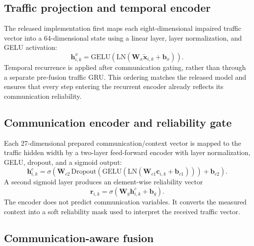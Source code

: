 \documentclass[pdflatex,sn-mathphys-num]{sn-jnl}%
\newenvironment{changed}{}{}
\theoremstyle{thmstyleone}%
\theoremstyle{thmstyletwo}%
\theoremstyle{thmstylethree}%
\begin{document}
\begin{changed}
\subsection{Traffic projection and temporal encoder}
\label{subsec:traffic_temporal_encoder}

The released implementation first maps each eight-dimensional impaired traffic vector into a 64-dimensional state using a linear layer, layer normalization, and GELU activation:
\begin{equation}
\mathbf{h}^{x}_{i,k}=\mathrm{GELU}\!\left(\mathrm{LN}\!\left(\mathbf{W}_{x}\widetilde{\mathbf{x}}_{i,k}+\mathbf{b}_{x}\right)\right).
\end{equation}
Temporal recurrence is applied after communication gating, rather than through a separate pre-fusion traffic GRU. This ordering matches the released model and ensures that every step entering the recurrent encoder already reflects its communication reliability.

\subsection{Communication encoder and reliability gate}
\label{subsec:communication_encoder}

Each 27-dimensional prepared communication/context vector is mapped to the traffic hidden width by a two-layer feed-forward encoder with layer normalization, GELU, dropout, and a sigmoid output:
\begin{equation}
\mathbf{h}^{c}_{i,k}=\sigma\!\left(\mathbf{W}_{c2}\,\mathrm{Dropout}\!\left(\mathrm{GELU}\!\left(\mathrm{LN}\!\left(\mathbf{W}_{c1}\mathbf{c}_{i,k}+\mathbf{b}_{c1}\right)\right)\right)+\mathbf{b}_{c2}\right).
\end{equation}
A second sigmoid layer produces an element-wise reliability vector
\begin{equation}
\mathbf{r}_{i,k}=\sigma\!\left(\mathbf{W}_{g}\mathbf{h}^{c}_{i,k}+\mathbf{b}_{g}\right).
\end{equation}
The encoder does not predict communication variables. It converts the measured context into a soft reliability mask used to interpret the received traffic vector.

\subsection{Communication-aware fusion}
\label{subsec:communication_fusion}


\end{changed}
\end{document}
